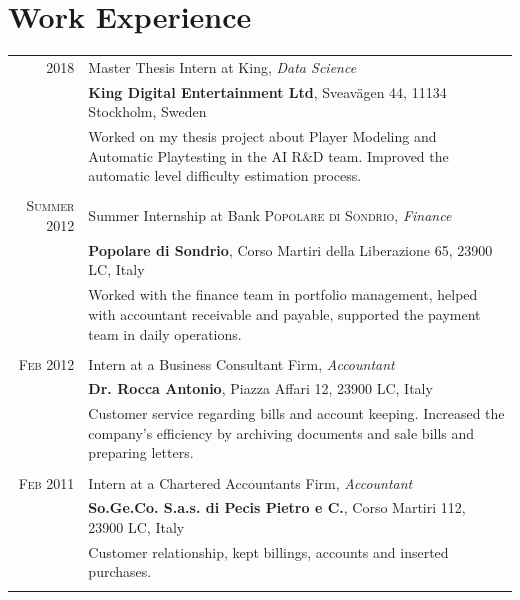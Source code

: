 \documentclass[a4paper,10pt]{article}
\begin{document}
\section{Work Experience}
\begin{tabular}{r|p{11cm}}

\textsc{2018} &
Master Thesis Intern at King, \emph{Data Science} \\ &
\textbf{King Digital Entertainment Ltd}, Sveavägen 44, 11134 Stockholm, Sweden \\ &
\small{Worked on my thesis project about Player Modeling and Automatic Playtesting in the AI R\&D team. Improved the automatic level difficulty estimation process.} \\ 

\multicolumn{2}{c}{}\\

\textsc{Summer 2012} &
Summer Internship at Bank \textsc{Popolare di Sondrio}, \emph{Finance} \\ &
\textbf{Popolare di Sondrio}, Corso Martiri della Liberazione 65, 23900 LC, Italy \\ &
\small{Worked with the finance team in portfolio management, helped with accountant receivable and payable, supported the payment team in daily operations.}\\

\multicolumn{2}{c}{}\\
 
\textsc{Feb 2012} &
Intern at a Business Consultant Firm, \emph{Accountant} \\ &
\textbf{Dr. Rocca Antonio}, Piazza Affari 12, 23900 LC, Italy \\ &
\small{Customer service regarding bills and account keeping. Increased the company’s efficiency by archiving documents and sale bills and preparing letters.} \\

\multicolumn{2}{c}{}\\
 
\textsc{Feb 2011} &
Intern at a Chartered Accountants Firm, \emph{Accountant} \\ &
\textbf{So.Ge.Co. S.a.s. di Pecis Pietro e C.}, Corso Martiri 112, 23900 LC, Italy \\ &
\small{Customer relationship, kept billings, accounts and inserted purchases.} \\ 

\multicolumn{2}{c}{}\\
\end{tabular}
\end{document}
